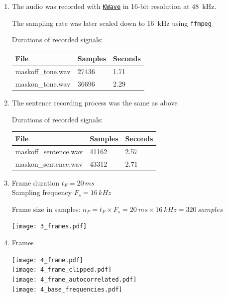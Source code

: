 \documentclass[a4paper, 11pt]{article}
\begin{document}
    \begin{enumerate}
        \item
        The audio was recorded with \texttt{\href{https://apps.kde.org/en/kwave}{KWave}} in 16-bit resolution at 48~kHz.

        The sampling rate was later scaled down to 16~kHz using \texttt{ffmpeg}

        Durations of recorded signals: \\
        \begin{tabular}{ | l | l | l | }
            \hline
            \textbf{File}     & \textbf{Samples} & \textbf{Seconds} \\ \hline
            maskoff\_tone.wav & 27436            & 1.71             \\ \hline
            maskon\_tone.wav  & 36696            & 2.29             \\ \hline
        \end{tabular}

        \item
        The sentence recording process was the same as above

        Durations of recorded signals: \\
        \begin{tabular}{ | l | l | l | }
            \hline
            \textbf{File}         & \textbf{Samples} & \textbf{Seconds} \\ \hline
            maskoff\_sentence.wav & 41162            & 2.57             \\ \hline
            maskon\_sentence.wav  & 43312            & 2.71             \\ \hline
        \end{tabular}

        \newpage
        \item
        Frame duration $t_F = 20\,ms$ \\
        Sampling frequency $F_s = 16\,kHz$

        Frame size in samples: $n_F = t_F \times F_s = 20~ms \times 16~kHz = 320~samples$

        \texttt{[image: 3\_frames.pdf]}

        \item
        Frames

        \texttt{[image: 4\_frame.pdf]} \\
        \texttt{[image: 4\_frame\_clipped.pdf]} \\
        \texttt{[image: 4\_frame\_autocorrelated.pdf]} \\
        \texttt{[image: 4\_base\_frequencies.pdf]}


\end{enumerate}
\end{document}
